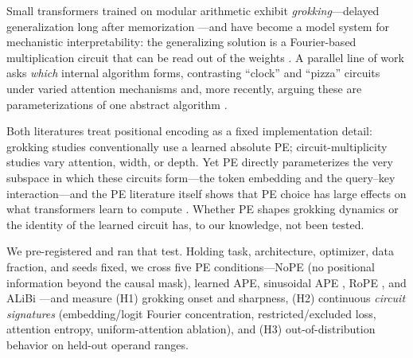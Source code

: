 \documentclass[letterpaper]{article}
\begin{document}
Small transformers trained on modular arithmetic exhibit
\emph{grokking}---delayed generalization long after memorization
\cite{power2022grokking}---and have become a model system for mechanistic
interpretability: the generalizing solution is a Fourier-based
multiplication circuit that can be read out of the weights
\cite{nanda2023progress}. A parallel line of work asks \emph{which} internal
algorithm forms, contrasting ``clock'' and ``pizza'' circuits under varied
attention mechanisms \cite{zhong2023clock} and, more recently, arguing these are
parameterizations of one abstract algorithm \cite{mccracken2025universal,
moisescu2025unifying}.

Both literatures treat positional encoding as a fixed implementation detail:
grokking studies conventionally use a learned absolute PE; circuit-multiplicity
studies vary attention, width, or depth. Yet PE directly parameterizes the very
subspace in which these circuits form---the token embedding and the
query--key interaction---and the PE literature itself shows that PE choice has
large effects on what transformers learn to compute
\cite{kazemnejad2023impact}. Whether PE shapes grokking dynamics or the identity
of the learned circuit has, to our knowledge, not been tested.

We pre-registered and ran that test. Holding task, architecture, optimizer, data
fraction, and seeds fixed, we cross five PE conditions---NoPE (no positional
information beyond the causal mask), learned APE, sinusoidal APE
\cite{vaswani2017attention}, RoPE \cite{su2021roformer}, and ALiBi
\cite{press2021train}---and measure (H1) grokking onset and sharpness, (H2)
continuous \emph{circuit signatures} (embedding/logit Fourier concentration,
restricted/excluded loss, attention entropy, uniform-attention ablation), and
(H3) out-of-distribution behavior on held-out operand ranges.
\end{document}
